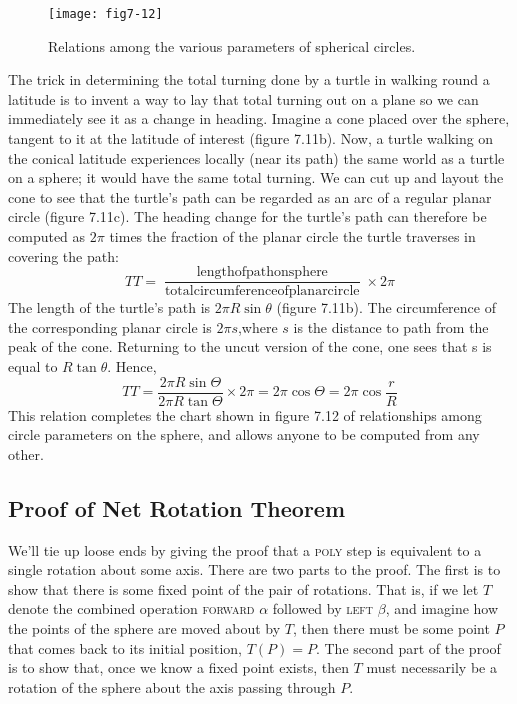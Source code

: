 \documentclass{book}
\begin{document}
\begin{figure}
\begin{center}
\texttt{[image: fig7-12]}
\caption{Relations among the various parameters of spherical circles.}
\end{center}
\end{figure}

The trick in determining the total turning done by a turtle in walking
round a latitude is to invent a way to lay that total turning out on a
plane so we can immediately see it as a change in heading. Imagine
a cone placed over the sphere, tangent to it at the latitude of interest
(figure 7.11b). Now, a turtle walking on the conical latitude experiences
locally (near its path) the same world as a turtle on a sphere; it would
have the same total turning. We can cut up and layout the cone to see
that the turtle's path can be regarded as an arc of a regular planar circle
(figure 7.11c). The heading change for the turtle's path can therefore be
computed as $2 \pi$ times the fraction of the planar circle the turtle traverses
in covering the path:
$$ TT = \frac {\operatorname{length of path on sphere}} {\operatorname{total circumference of planar circle}} \times 2 \pi $$
 The length of the turtle's path is $2 \pi R \sin \theta$ (figure 7.11b). The circumference of the corresponding planar circle is $2 \pi s$,where $s$ is the distance
to path from the peak of the cone. Returning to the uncut version of
the cone, one sees that s is equal to $R \tan \theta$. Hence,
$$TT = \frac{2 \pi R \sin \Theta} {2 \pi R \tan \Theta} \times 2 \pi = 2 \pi \cos \Theta = 2 \pi \cos \frac {r} {R} $$
 This relation completes the chart shown in figure 7.12 of relationships
among circle parameters on the sphere, and allows anyone to be computed from any other.

\subsection{Proof of Net Rotation Theorem}

We'll tie up loose ends by giving the proof that a \textsc{poly} step is equivalent
to a single rotation about some axis. There are two parts to the proof.
The first is to show that there is some fixed point of the pair of rotations.
That is, if we let $T$ denote the combined operation \textsc{forward} $\alpha$ followed
by \textsc{left} $\beta$, and imagine how the points of the sphere are moved about
by $T$, then there must be some point $P$ that comes back to its initial
position, $T(P) = P$. The second part of the proof is to show that, once
we know a fixed point exists, then $T$ must necessarily be a rotation of
the sphere about the axis passing through $P$.
\end{document}
